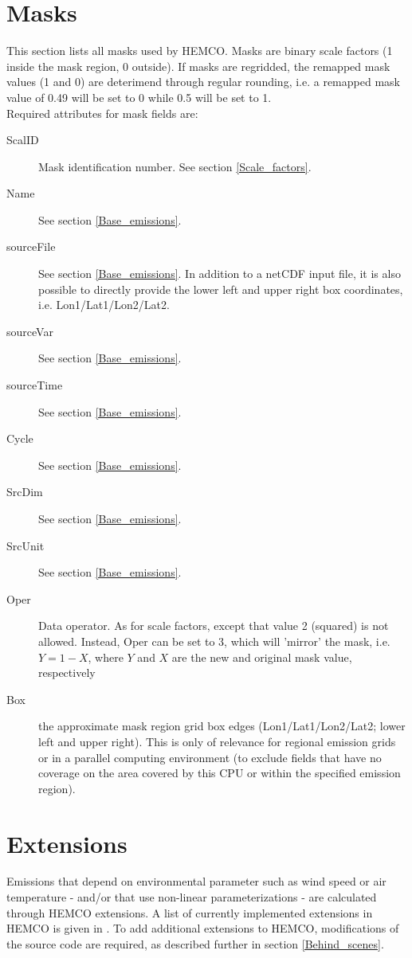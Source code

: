 \documentclass[12pt,a4paper]{article} %
\begin{document}
\section{Masks} \label{Masks}
This section lists all masks used by HEMCO. Masks are binary scale factors (1 inside the mask region, 0 outside). If masks are regridded, the remapped mask values (1 and 0) are deterimend through regular rounding, i.e. a remapped mask value of 0.49 will be set to 0 while 0.5 will be set to 1.\\
Required attributes for mask fields are:
\begin{description}
\item [ScalID] Mask identification number. See section \ref{Scale_factors}.
\item [Name] See section \ref{Base_emissions}.
\item [sourceFile] See section \ref{Base_emissions}. In addition to a netCDF input file, it is also possible to directly provide the lower left and upper right box coordinates, i.e. Lon1/Lat1/Lon2/Lat2.
\item [sourceVar] See section \ref{Base_emissions}.
\item [sourceTime] See section \ref{Base_emissions}.
\item [Cycle] See section \ref{Base_emissions}.
\item [SrcDim] See section \ref{Base_emissions}.
\item [SrcUnit] See section \ref{Base_emissions}.
\item [Oper] Data operator. As for scale factors, except that value 2 (squared) is not allowed. Instead, Oper can be set to 3, which will 'mirror' the mask, i.e. $Y=1-X$, where $Y$ and $X$ are the new and original mask value, respectively
\item [Box] the approximate mask region grid box edges (Lon1/Lat1/Lon2/Lat2; lower left and upper right). This is only of relevance for regional emission grids or in a parallel computing environment (to exclude fields that have no coverage on the area covered by this CPU or within the specified emission region).
\end{description}

\section{Extensions} \label{Extensions}
Emissions that depend on environmental parameter such as wind speed or air temperature - and/or that use non-linear parameterizations - are calculated through HEMCO extensions. A list of currently implemented extensions in HEMCO is given in \cite{Keller_2014}. To add additional extensions to HEMCO, modifications of the source code are required, as described further in section \ref{Behind_scenes}.
\end{document}
